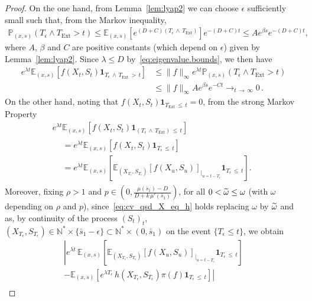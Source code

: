 \documentclass[AHL,Unicode,longabstracts,published]{cedram}
\newcommand{\PP}{\mathbb{P}}
\newcommand{\NN}{\mathbb{N}}
\newcommand{\EE}{\mathbb{E}}
\newcommand{\Text}{T_{\mathrm{Ext}}}
\newcommand{\1}{\mathbf{1}}
\let\oldtilde\tilde
\renewcommand*{\tilde}[1]{\mathchoice{\widetilde{#1}}{\widetilde{#1}}{\oldtilde{#1}}{\oldtilde{#1}}}
\begin{document}
\begin{proof}
On the one hand, from Lemma~\ref{lem:lyap2} we can choose $\epsilon$ sufficiently small such that, from the Markov inequality,
\begin{align}\label{eq:proba.T_epsilon}
\PP_{(x,s)}\left(T_\epsilon\wedge \Text >t\right)\leq \EE_{(x,s)}\left[e^{(D+C)\left(T_\epsilon\,\wedge\,\Text\right)} \right] e^{-(D+C)t} \leq A e^{\beta s} e^{-(D+C)t},
\end{align}
where $A$, $\beta$ and $C$ are positive constants (which depend on $\epsilon$) given by Lemma~\ref{lem:lyap2}. Since $\lambda \leq D$ by~\eqref{eq:eigenvalue.bounds}, we then have
\begin{align*}
e^{\lambda t}\EE_{(x,s)}\left[f(X_t,S_t)\1_{T_\epsilon\,\wedge\,\Text\,>\,t}\right] &\leq \|f \|_\infty e^{\lambda t} \PP_{(x,s)}\left(T_\epsilon\wedge \Text>t\right) \\
&\leq \|f \|_\infty A e^{\beta s} e^{-Ct} \longrightarrow_{t\,\to\,\infty} 0\,.
\end{align*}
On the other hand, noting that $f(X_t,S_t)\1_{\Text\,\leq\,t}=0$, from the strong Markov Property
\begin{multline}\label{eq:T_eps_leq_t}
e^{\lambda t}\EE_{(x,s)} \left[f(X_t,S_t)\1_{(T_\epsilon\,\wedge\,\Text)\,\leq\,t}\right]
\\
\begin{aligned}
&=e^{\lambda t}\EE_{(x,s)} \left[f(X_t,S_t)\1_{T_\epsilon\,\leq\,t}\right] \\
&= e^{\lambda t} \EE_{(x,s)} \left[
\EE_{\left(X_{T_\epsilon},S_{T_\epsilon}\right)}\left[f(X_{u},S_{u}) \right]_{\vert_{u=t-T_\epsilon}} \1_{T_\epsilon\,\leq\,t} \right].
\end{aligned}
\end{multline}
Moreover, fixing $\rho>1$ and $p\in(0,\frac{\mu(\bar s_1)-D}{D+k\,\mu'(\bar s_1)})$, for all $0<\tilde \omega\leq \omega$ (with $\omega$ depending on $\rho$ and $p$), since~\eqref{eq:cv_qsd_X_eq_h} holds replacing $\omega$ by $\tilde \omega$ and as, by continuity of the process $(S_t)_t$, $(X_{T_\epsilon},S_{T_\epsilon})\in\NN^*\times \{\bar s_1-\epsilon\}\subset \NN^*\times (0,\bar s_1)$ on the event $\{T_\epsilon\leq t\}$, we obtain
\begin{multline}\label{eq:cv.T_eps_leq_t}
 \left|e^{\lambda t}\,\EE_{(x,s)} \left[
\EE_{\left(X_{T_\epsilon},S_{T_\epsilon}\right)}\left[f\left(X_{u},S_{u}\right) \right]_{\vert_{u=t-T_\epsilon}} \1_{T_\epsilon\,\leq\,t} \right]\right.\\
-\left. \EE_{(x,s)} \left[e^{\lambda T_\epsilon} \, h\left(X_{T_\epsilon},S_{T_\epsilon}\right)\pi(f) \1_{T_\epsilon\,\leq\,t} \right] \right|\\

\end{multline}
\end{proof}
\end{document}
